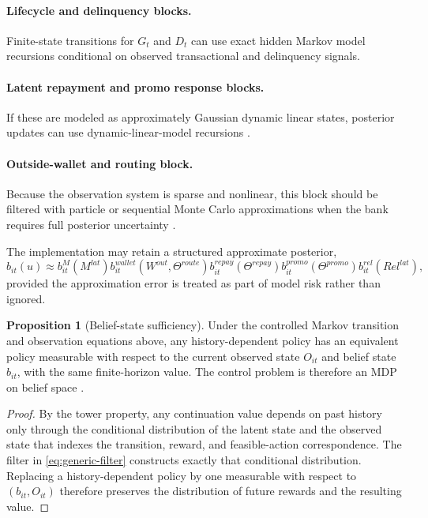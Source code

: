 \documentclass[11pt]{article}
\newcommand{\1}{\mathbf{1}}
\theoremstyle{definition}
\newtheorem{proposition}[definition]{Proposition}
\begin{document}
\paragraph{Lifecycle and delinquency blocks.}
Finite-state transitions for $G_t$ and $D_t$ can use exact hidden Markov model
recursions conditional on observed transactional and delinquency signals.

\paragraph{Latent repayment and promo response blocks.}
If these are modeled as approximately Gaussian dynamic linear states, posterior
updates can use dynamic-linear-model recursions \citep{westharrison1997bfdm}.

\paragraph{Outside-wallet and routing block.}
Because the observation system is sparse and nonlinear, this block should be
filtered with particle or sequential Monte Carlo approximations when the bank
requires full posterior uncertainty \citep{doucet2001smc}.

The implementation may retain a structured approximate posterior,
\begin{equation}
  b_{it}(u)
  \approx
  b^{M}_{it}(M^{lat})
  b^{wallet}_{it}(W^{out},\Theta^{route})
  b^{repay}_{it}(\Theta^{repay})
  b^{promo}_{it}(\Theta^{promo})
  b^{rel}_{it}(Rel^{lat}),
  \label{eq:factorized-belief}
\end{equation}
provided the approximation error is treated as part of model risk rather than
ignored.

\begin{proposition}[Belief-state sufficiency]
Under the controlled Markov transition and observation equations above, any
history-dependent policy has an equivalent policy measurable with respect to the
current observed state $O_{it}$ and belief state $b_{it}$, with the same
finite-horizon value. The control problem is therefore an MDP on belief space
\citep{smallwood1973pomdp,kaelbling1998pomdp}.
\end{proposition}

\begin{proof}
By the tower property, any continuation value depends on past history only
through the conditional distribution of the latent state and the observed state
that indexes the transition, reward, and feasible-action correspondence. The
filter in \eqref{eq:generic-filter} constructs exactly that conditional
distribution. Replacing a history-dependent policy by one measurable with
respect to $(b_{it},O_{it})$ therefore preserves the distribution of future
rewards and the resulting value.
\end{proof}
\end{document}
